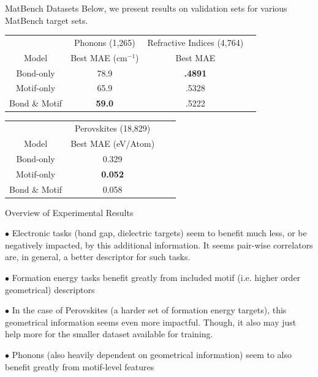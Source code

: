 \documentclass[11pt]{beamer}
\begin{document}
\begin{frame}{MatBench Datasets}\small
Below, we present results on validation sets for various MatBench target sets.


\begin{tabular}{c|ccc}
& Phonons (1,265) & Refractive Indices (4,764) \\
Model & Best MAE (cm$^{-1}$) & Best MAE \\
\hline
Bond-only & 78.9& \textbf{.4891}\\
Motif-only & 65.9& .5328\\
Bond \& Motif & \textbf{59.0}& .5222\\
\end{tabular}


\vspace{0.5cm}

\begin{tabular}{c|ccc}
& Perovskites (18,829)\\
Model & Best MAE (eV/Atom) \\
\hline
Bond-only & 0.329\\
Motif-only & \textbf{ 0.052}\\
Bond \& Motif & 0.058\\
\end{tabular}

\end{frame}
\begin{frame}{Overview of Experimental Results}\small

$\bullet$  Electronic tasks (band gap, dielectric targets) seem to benefit much less, or be negatively impacted, by this additional information. \pause It seems pair-wise correlators are, in general, a better descriptor for such tasks.

\vspace{.5cm}\pause

$\bullet$ Formation energy tasks benefit greatly from included motif (i.e. higher order geometrical) descriptors

\vspace{.5cm}\pause

$\bullet$ In the case of Perovskites (a harder set of formation energy targets), this geometrical information seems even more impactful\pause . Though, it also may just help more for the smaller dataset available for training.

\vspace{.5cm}\pause

$\bullet$ Phonons (also heavily dependent on geometrical information) seem to also benefit greatly from motif-level features

\vspace{.5cm}

\end{frame}
\end{document}
